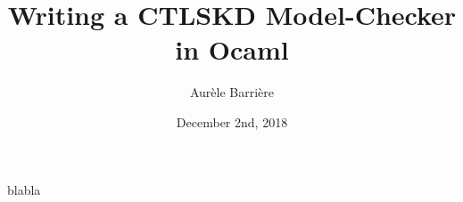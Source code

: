 \documentclass{acmart}
\title{Writing a CTLSKD Model-Checker in Ocaml}
\author{Aur\`ele Barri\`ere}
\date{December 2nd, 2018}
\begin{document}
\maketitle

blabla
\end{document}
